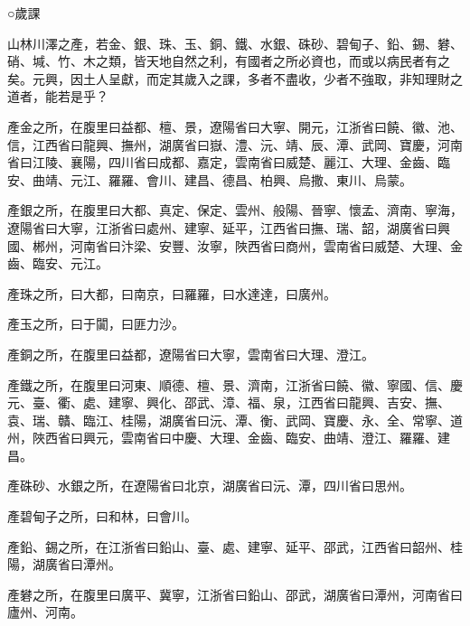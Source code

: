 
\begin{pinyinscope}

 ○歲課



 山林川澤之產，若金、銀、珠、玉、銅、鐵、水銀、硃砂、碧甸子、鉛、錫、礬、硝、堿、竹、木之類，皆天地自然之利，有國者之所必資也，而或以病民者有之矣。元興，因土人呈獻，而定其歲入之課，多者不盡收，少者不強取，非知理財之道者，能若是乎？



 產金之所，在腹里曰益都、檀、景，遼陽省曰大寧、開元，江浙省曰饒、徽、池、信，江西省曰龍興、撫州，湖廣省曰嶽、澧、沅、靖、辰、潭、武岡、寶慶，河南省曰江陵、襄陽，四川省曰成都、嘉定，雲南省曰威楚、麗江、大理、金齒、臨安、曲靖、元江、羅羅、會川、建昌、德昌、柏興、烏撒、東川、烏蒙。



 產銀之所，在腹里曰大都、真定、保定、雲州、般陽、晉寧、懷孟、濟南、寧海，遼陽省曰大寧，江浙省曰處州、建寧、延平，江西省曰撫、瑞、韶，湖廣省曰興國、郴州，河南省曰汴梁、安豐、汝寧，陜西省曰商州，雲南省曰威楚、大理、金齒、臨安、元江。



 產珠之所，曰大都，曰南京，曰羅羅，曰水達達，曰廣州。



 產玉之所，曰于闐，曰匪力沙。



 產銅之所，在腹里曰益都，遼陽省曰大寧，雲南省曰大理、澄江。



 產鐵之所，在腹里曰河東、順德、檀、景、濟南，江浙省曰饒、徽、寧國、信、慶元、臺、衢、處、建寧、興化、邵武、漳、福、泉，江西省曰龍興、吉安、撫、袁、瑞、贛、臨江、桂陽，湖廣省曰沅、潭、衡、武岡、寶慶、永、全、常寧、道州，陜西省曰興元，雲南省曰中慶、大理、金齒、臨安、曲靖、澄江、羅羅、建昌。



 產硃砂、水銀之所，在遼陽省曰北京，湖廣省曰沅、潭，四川省曰思州。



 產碧甸子之所，曰和林，曰會川。



 產鉛、錫之所，在江浙省曰鉛山、臺、處、建寧、延平、邵武，江西省曰韶州、桂陽，湖廣省曰潭州。



 產礬之所，在腹里曰廣平、冀寧，江浙省曰鉛山、邵武，湖廣省曰潭州，河南省曰廬州、河南。




\end{pinyinscope}

